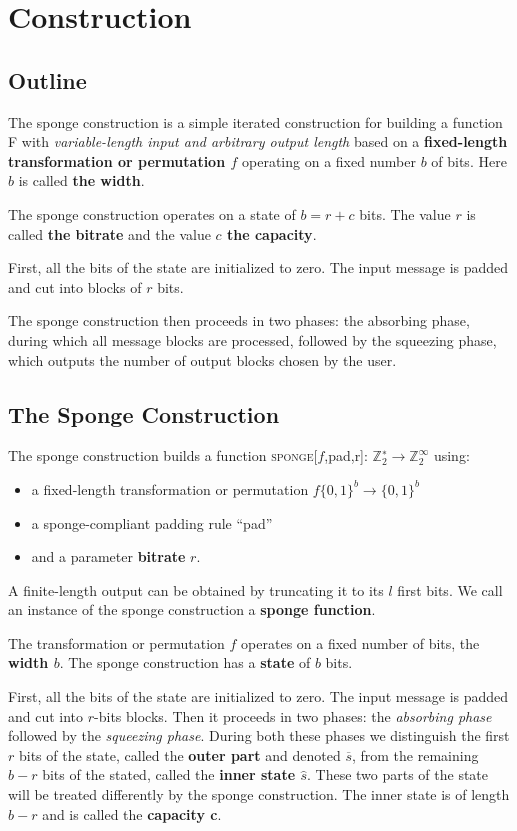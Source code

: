 \section{Construction}\label{sec:Sponge}
\subsection{Outline}
The sponge construction is a simple iterated construction for building a function F with \emph{variable-length input and arbitrary output length} based on a \textbf{fixed-length transformation or permutation $f$} operating on a fixed number $b$ of bits. Here $b$ is called \textbf{the width}.

The sponge construction operates on a state of $b = r + c$ bits. The value $r$ is called \textbf{the bitrate} and the value \textbf{$c$ the capacity}.

First, all the bits of the state are initialized to zero. The input message is padded and cut into blocks of $r$ bits. 

The sponge construction then proceeds in two phases: the absorbing phase, during which all message blocks are processed, followed by the squeezing phase, which outputs the number of output blocks chosen by the user.


\subsection{The Sponge Construction}\label{section:sponge}
The sponge construction builds a function \textsc{sponge}[$f$,pad,r]: $\mathbb{Z}_2^∗ \rightarrow \mathbb{Z}_2^\infty$ using:
\begin{itemize}[label=\textperiodcentered,nolistsep]
\item a fixed-length transformation or permutation $f{\{0,1\}}^b \rightarrow {\{0,1\}}^b$
\item a sponge-compliant padding rule “pad”
\item and a parameter \textbf{bitrate} $r$.
\end{itemize}
A finite-length output can be obtained by truncating it to its $l$ first bits. We call an instance of the sponge construction a \textbf{sponge function}.

The transformation or permutation $f$ operates on a fixed number of bits, the \textbf{width $b$}. The sponge construction has a \textbf{state} of $b$ bits. 

First, all the bits of the state are initialized to zero. The input message is padded and cut into $r$-bits blocks. Then it proceeds in two phases: the \emph{absorbing phase} followed by the \emph{squeezing phase}. During both these phases we distinguish the first $r$ bits of the state, called the \textbf{outer part} and denoted \textbf{$\overline{s}$}, from the remaining $b − r$ bits of the stated, called the \textbf{inner state $\widehat{s}$}. These two parts of the state will be treated differently by the sponge construction.  The inner state is of length $b − r$ and is called the \textbf{capacity c}. 

